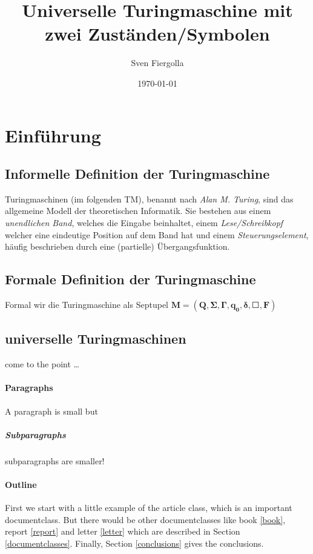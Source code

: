 \documentclass[12pt, a4paper, twoside]{article}
\author{Sven Fiergolla}
\title{Universelle Turingmaschine mit zwei Zuständen/Symbolen}
\date{\today}
\begin{document}
 
\maketitle


\section{Einführung}
\subsection{Informelle Definition der Turingmaschine}
Turingmaschinen (im folgenden TM), benannt nach \textit{Alan M. Turing}, sind das allgemeine Modell der theoretischen Informatik.
Sie bestehen aus einem \textit{unendlichen Band}, welches die Eingabe beinhaltet, einem \textit{Lese/Schreibkopf} welcher eine eindeutige Position auf dem Band hat und einem \textit{Steuerungselement}, häufig beschrieben durch eine (partielle) Übergangsfunktion.


\subsection{Formale Definition der Turingmaschine}
Formal wir die Turingmaschine als Septupel $\mathbf{ M = (Q,\Sigma,\Gamma,q_0,\delta,\Square,F)} $



\subsection{universelle Turingmaschinen}
come to the point \ldots

\paragraph{Paragraphs}
A paragraph is small but 

\subparagraph{Subparagraphs}
subparagraphs are smaller! 

\paragraph{Outline}
First we start with a little example of the article class, which is an 
important documentclass. But there would be other documentclasses like 
book \ref{book}, report \ref{report} and letter \ref{letter} which are 
described in Section \ref{documentclasses}. Finally, Section 
\ref{conclusions} gives the conclusions.
\end{document}
